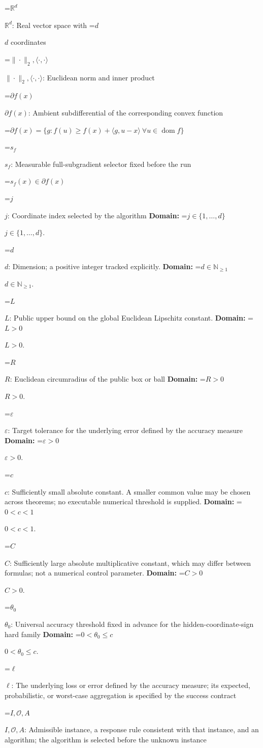 \documentclass[10pt,a4paper]{article}
\newcommand{\AtlasMath}[1]{\par\begingroup\centering\setbox0=\hbox{$\displaystyle #1$}\ifdim\wd0>1.4\linewidth\typeout{ATLAS WIDE FORMULA: \the\wd0}\fi\ifdim\wd0>\linewidth\resizebox{\linewidth}{!}{\box0}\else\box0\fi\par\endgroup}
\newcommand{\AtlasInlineMath}[1]{\begingroup\setbox0=\hbox{$#1$}\ifdim\wd0>.4\linewidth\endgroup\AtlasMath{#1}\else\endgroup$#1$\fi}
\begin{document}
\AtlasInlineMath{\mathbb{R}^d}: Real vector space with \AtlasInlineMath{d} coordinates

\AtlasInlineMath{\|\cdot\|_2,\langle\cdot,\cdot\rangle}: Euclidean norm and inner product

\AtlasInlineMath{\partial f(x)}: Ambient subdifferential of the corresponding convex function


\AtlasMath{\partial f(x)=\{g:f(u)\ge f(x)+\langle g,u-x\rangle\ \forall u\in\operatorname{dom}f\}}


\AtlasInlineMath{s_f}: Measurable full-subgradient selector fixed before the run


\AtlasMath{s_f(x)\in\partial f(x)}


\AtlasInlineMath{j}: Coordinate index selected by the algorithm \textbf{Domain:} \AtlasInlineMath{j\in\{1,\ldots,d\}}.

\AtlasInlineMath{d}: Dimension; a positive integer tracked explicitly. \textbf{Domain:} \AtlasInlineMath{d\in\mathbb{N}_{\ge1}}.

\AtlasInlineMath{L}: Public upper bound on the global Euclidean Lipschitz constant. \textbf{Domain:} \AtlasInlineMath{L>0}.

\AtlasInlineMath{R}: Euclidean circumradius of the public box or ball \textbf{Domain:} \AtlasInlineMath{R>0}.

\AtlasInlineMath{\varepsilon}: Target tolerance for the underlying error defined by the accuracy measure \textbf{Domain:} \AtlasInlineMath{\varepsilon>0}.

\AtlasInlineMath{c}: Sufficiently small absolute constant. A smaller common value may be chosen across theorems; no executable numerical threshold is supplied. \textbf{Domain:} \AtlasInlineMath{0<c<1}.

\AtlasInlineMath{C}: Sufficiently large absolute multiplicative constant, which may differ between formulas; not a numerical control parameter. \textbf{Domain:} \AtlasInlineMath{C>0}.

\AtlasInlineMath{\theta_0}: Universal accuracy threshold fixed in advance for the hidden-coordinate-sign hard family \textbf{Domain:} \AtlasInlineMath{0<\theta_0\le c}.

\AtlasInlineMath{\ell}: The underlying loss or error defined by the accuracy measure; its expected, probabilistic, or worst-case aggregation is specified by the success contract

\AtlasInlineMath{I,\mathcal{O},A}: Admissible instance, a response rule consistent with that instance, and an algorithm; the algorithm is selected before the unknown instance
\end{document}
